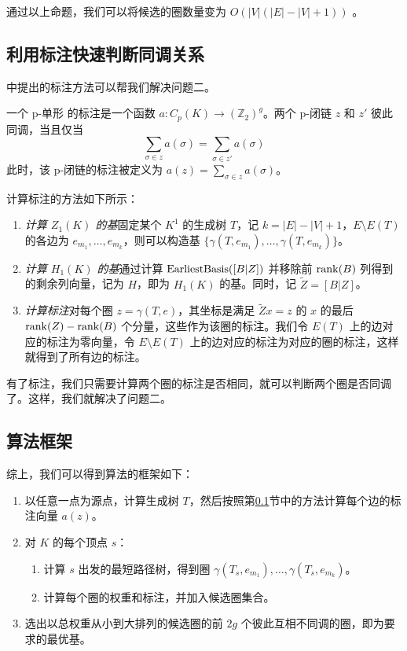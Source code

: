 通过以上命题，我们可以将候选的圈数量变为 $ O(|V|(|E|-|V|+1)) $ 。

\subsection{利用标注快速判断同调关系}
\label{subsec:annotation}

\citet{Busaryev2012} 中提出的标注方法可以帮我们解决问题二。

\begin{definition}
    一个 p-单形 的标注是一个函数 $ a: C_p(K) \to (\mathbb{Z}_2)^{g} $。两个 p-闭链 $ z $ 和 $ z' $ 彼此同调，当且仅当
    \begin{equation*}
        \sum_{\sigma \in z} a(\sigma) = \sum_{\sigma \in z'} a(\sigma)
    \end{equation*}
    此时，该 p-闭链的标注被定义为 $ a(z) = \sum_{\sigma \in z} a(\sigma) $。
\end{definition}

计算标注的方法如下所示：
\begin{enumerate}
    \item \emph{计算 $ Z_1(K) $ 的基}\quad 固定某个 $ K^1 $ 的生成树 $ T $，记 $ k = |E| - |V| + 1 $，$ E \setminus E(T) $ 的各边为 $ e_{m_1}, \dots, e_{m_k} $，则可以构造基 $ \{ \gamma(T, e_{m_1}), \dots, \gamma(T, e_{m_{k}}) \} $。
    \item \emph{计算 $ H_1(K) $ 的基}\quad 通过计算 $ {\rm EarliestBasis}([B | Z]) $ 并移除前 $ {\rm rank}(B) $ 列得到的剩余列向量，记为 $ H $，即为 $ H_1(K) $ 的基。同时，记 $ \tilde{Z} = [B | Z] $。
    \item \emph{计算标注}\quad 对每个圈 $ z = \gamma(T, e) $，其坐标是满足 $ \tilde{Z} x = z $ 的 $ x $ 的最后 $ {\rm rank}(Z) - {\rm rank}(B) $ 个分量，这些作为该圈的标注。我们令 $ E(T) $ 上的边对应的标注为零向量，令 $ E \setminus E(T) $ 上的边对应的标注为对应的圈的标注，这样就得到了所有边的标注。
\end{enumerate}

有了标注，我们只需要计算两个圈的标注是否相同，就可以判断两个圈是否同调了。这样，我们就解决了问题二。

\subsection{算法框架}

综上，我们可以得到算法的框架如下：

\begin{enumerate}
    \item 以任意一点为源点，计算生成树 $ T $，然后按照第\ref{subsec:annotation}节中的方法计算每个边的标注向量 $ a(z) $。
    \item 对 $ K $ 的每个顶点 $ s $：
    \begin{enumerate}
        \item 计算 $ s $ 出发的最短路径树，得到圈 $ \gamma(T_s, e_{m_1}), \dots, \gamma(T_s, e_{m_k}) $。
        \item 计算每个圈的权重和标注，并加入候选圈集合。
    \end{enumerate}
    \item 选出以总权重从小到大排列的候选圈的前 $ 2g $ 个彼此互相不同调的圈，即为要求的最优基。
\end{enumerate}

